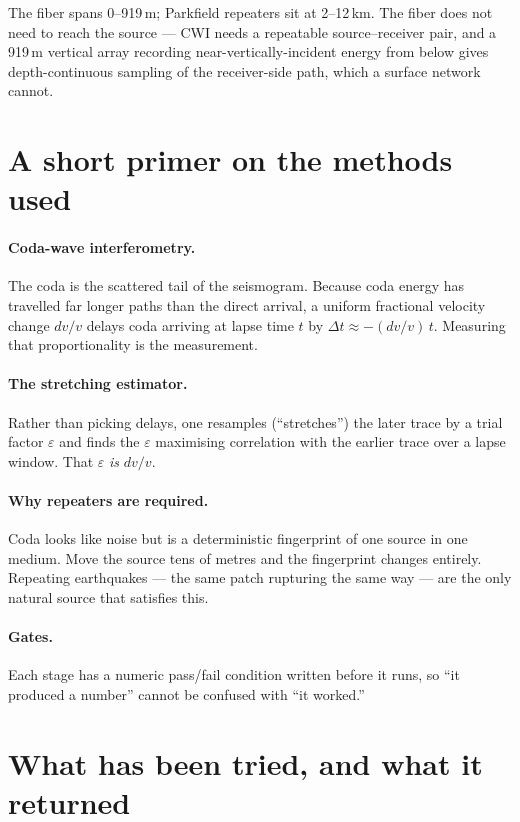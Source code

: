 \documentclass[11pt]{article}
\begin{document}
The fiber spans 0--919\,m; Parkfield repeaters sit at 2--12\,km. The fiber does
not need to reach the source --- CWI needs a repeatable source--receiver pair, and
a 919\,m vertical array recording near-vertically-incident energy from below
gives depth-continuous sampling of the receiver-side path, which a surface
network cannot.

\section{A short primer on the methods used}

\paragraph{Coda-wave interferometry.} The coda is the scattered tail of the
seismogram. Because coda energy has travelled far longer paths than the direct
arrival, a uniform fractional velocity change $dv/v$ delays coda arriving at
lapse time $t$ by $\Delta t \approx -(dv/v)\,t$. Measuring that proportionality
is the measurement.

\paragraph{The stretching estimator.} Rather than picking delays, one resamples
(``stretches'') the later trace by a trial factor $\varepsilon$ and finds the
$\varepsilon$ maximising correlation with the earlier trace over a lapse window.
That $\varepsilon$ \emph{is} $dv/v$.

\paragraph{Why repeaters are required.} Coda looks like noise but is a
deterministic fingerprint of one source in one medium. Move the source tens of
metres and the fingerprint changes entirely. Repeating earthquakes --- the same
patch rupturing the same way --- are the only natural source that satisfies this.

\paragraph{Gates.} Each stage has a numeric pass/fail condition written before it
runs, so ``it produced a number'' cannot be confused with ``it worked.''

\section{What has been tried, and what it returned}
\end{document}
